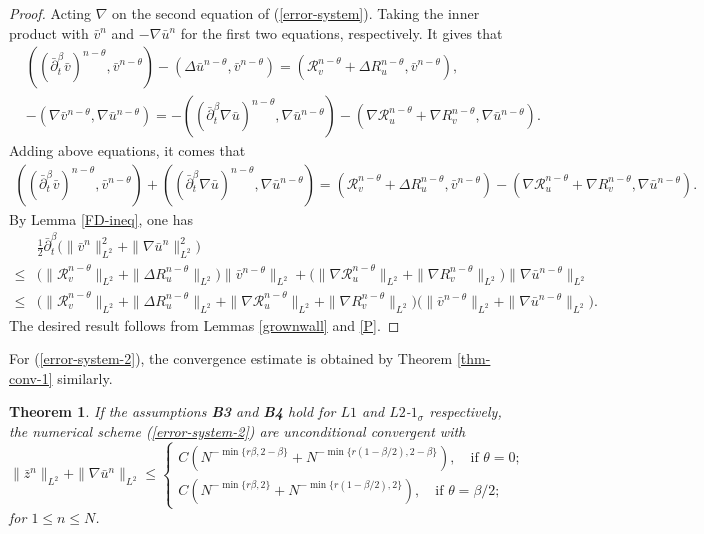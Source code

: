 \documentclass[11pt]{article}
\newtheorem{theorem}{Theorem}
\numberwithin{equation}{section}
\begin{document}
\begin{proof}
Acting $\nabla$ on the second equation of (\ref{error-system}).
Taking the inner product with $\bar v^n$ and $-\nabla \bar u^n$ for the first two equations, respectively. It gives that
\begin{align*}
&((\bar\partial_t^\beta \bar v)^{n-\theta},\bar v^{n-\theta}) - (\Delta \bar u^{n-\theta},\bar v^{n-\theta}) = (\mathcal{R}_v^{n-\theta}+\Delta R_u^{n-\theta},\bar v^{n-\theta}), \\
&-(\nabla\bar v^{n-\theta},\nabla \bar u^{n-\theta}) 
= -((\bar\partial_t^\beta \nabla\bar u)^{n-\theta},\nabla \bar u^{n-\theta})-(\nabla\mathcal{R}_u^{n-\theta}+\nabla R_v^{n-\theta},\nabla \bar u^{n-\theta}).
\end{align*}
Adding above equations, it comes that
\begin{align*}
((\bar\partial_t^\beta \bar v)^{n-\theta},\bar v^{n-\theta}) + ((\bar\partial_t^\beta \nabla \bar u)^{n-\theta},\nabla \bar u^{n-\theta}) = (\mathcal{R}_v^{n-\theta}+\Delta R_u^{n-\theta},\bar v^{n-\theta})-(\nabla \mathcal{R}_u^{n-\theta}+\nabla R_v^{n-\theta},\nabla \bar u^{n-\theta}).
\end{align*}
By Lemma \ref{FD-ineq}, one has
\begin{align*}
&\frac12\bar\partial_t^\beta \big(\|\bar v^n\|_{L^2}^2 + \|\nabla \bar u^n\|_{L^2}^2\big) \\
\le& \big(\|\mathcal{R}_v^{n-\theta}\|_{L^2}+\|\Delta R_u^{n-\theta}\|_{L^2}\big)\|\bar v^{n-\theta}\|_{L^2}+\big(\|\nabla \mathcal{R}_u^{n-\theta}\|_{L^2}+\|\nabla R_v^{n-\theta}\|_{L^2}\big)\|\nabla \bar u^{n-\theta}\|_{L^2}\\
\le&\big(\|\mathcal{R}_v^{n-\theta}\|_{L^2}+\|\Delta R_u^{n-\theta}\|_{L^2}+\|\nabla \mathcal{R}_u^{n-\theta}\|_{L^2}+\|\nabla R_v^{n-\theta}\|_{L^2}\big)\big(\|\bar v^{n-\theta}\|_{L^2}+\|\nabla \bar u^{n-\theta}\|_{L^2}\big).
\end{align*}
The desired result follows from Lemmas \ref{grownwall} and \ref{P}.
\end{proof}

For (\ref{error-system-2}), the convergence estimate is obtained by Theorem \ref{thm-conv-1} similarly.
\begin{theorem}\label{thm-conv-2}
If the assumptions \textbf{B3} and \textbf{B4} hold for $L1$ and $L2$-$1_\sigma$ respectively, the numerical scheme (\ref{error-system-2}) are unconditional convergent with 
\[ \|\bar z^n\|_{L^2}+\|\nabla \bar u^n\|_{L^2} \le 
\begin{cases} C(N^{-\min\{r\beta,2-\beta\}}+N^{-\min\{r(1-\beta/2),2-\beta\}}), \quad \text{if } \theta=0;\\ 
C(N^{-\min\{r\beta,2\}}+N^{-\min\{r(1-\beta/2),2\}}),\quad \text{if } \theta=\beta/2; 
\end{cases} \] for $1 \leq n \leq N$. 
\end{theorem}
\end{document}
